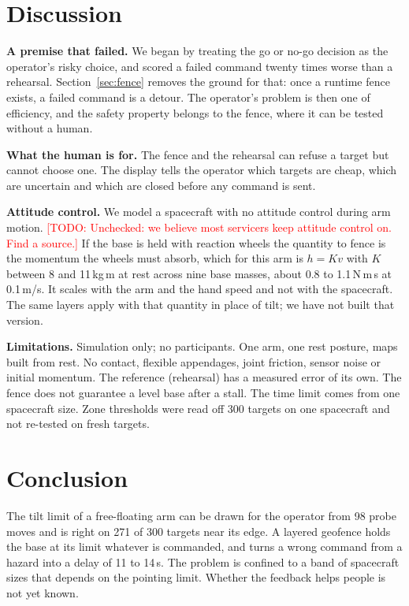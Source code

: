 \documentclass[conference]{IEEEtran}
\newcommand{\todo}[1]{\textcolor{red}{[TODO: #1]}}
\begin{document}
\section{Discussion}
\textbf{A premise that failed.} We began by treating the go or no-go decision as the operator's risky
choice, and scored a failed command twenty times worse than a rehearsal. Section~\ref{sec:fence} removes
the ground for that: once a runtime fence exists, a failed command is a detour. The operator's problem is
then one of efficiency, and the safety property belongs to the fence, where it can be tested without a
human.

\textbf{What the human is for.} The fence and the rehearsal can refuse a target but cannot choose one. The
display tells the operator which targets are cheap, which are uncertain and which are closed before any
command is sent.

\textbf{Attitude control.} We model a spacecraft with no attitude control during arm motion.
\todo{Unchecked: we believe most servicers keep attitude control on. Find a source.} If the base is held
with reaction wheels the quantity to fence is the momentum the wheels must absorb, which for this arm is
$h=Kv$ with $K$ between 8 and 11\,kg\,m at rest across nine base masses, about 0.8 to 1.1\,N\,m\,s at
0.1\,m/s. It scales with the arm and the hand speed and not with the spacecraft. The same layers apply
with that quantity in place of tilt; we have not built that version.

\textbf{Limitations.} Simulation only; no participants. One arm, one rest posture, maps built from rest.
No contact, flexible appendages, joint friction, sensor noise or initial momentum. The reference
(rehearsal) has a measured error of its own. The fence does not guarantee a level base after a stall. The
time limit comes from one spacecraft size. Zone thresholds were read off 300 targets on one spacecraft and
not re-tested on fresh targets.

\section{Conclusion}
The tilt limit of a free-floating arm can be drawn for the operator from 98 probe moves and is right on
271 of 300 targets near its edge. A layered geofence holds the base at its limit whatever is commanded,
and turns a wrong command from a hazard into a delay of 11 to 14\,s. The problem is confined to a band of
spacecraft sizes that depends on the pointing limit. Whether the feedback helps people is not yet known.
\end{document}

